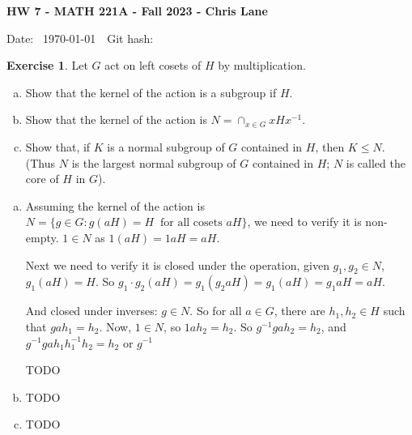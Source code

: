 \documentclass[11pt,oneside]{article}
\numberwithin{equation}{section}
\theoremstyle{definition}
\newtheorem{exercise}{Exercise}
\begin{document}
\textbf{HW 7 - MATH 221A - Fall 2023 - Chris Lane}

Date: \hhmmsstime{} \ \today \ \ Git hash: 


\begin{exercise}
  Let $G$ act on left cosets of $H$ by multiplication.
  \begin{enumerate}[(a)]
  \item
    Show that the kernel of the action is a subgroup if $H$.  
  \item
    Show that the kernel of the action is $N = \cap _{x \in G} xHx^{-1}$.
  \item
    Show that, if $K$ is a normal subgroup of $G$ contained in $H$,
    then $K \leq N$.  (Thus $N$ is the largest normal subgroup of $G$
    contained in $H$; $N$ is called the core of $H$ in $G$).
  \end{enumerate}
\end{exercise}
\begin{solution} 
  \begin{enumerate}[(a)]
  \item
    Assuming the kernel of the action is $ N = \{ g \in G : g(aH) = H \ \textrm{ for all cosets } aH \}$,
    we need to verify it is non-empty.  $1 \in N$ as $1 (aH) = 1aH = aH$.

    Next we need to verify it is closed under the operation,
    given $g_1, g_2 \in N$, $g_1(aH) = H$.  So $g_1 \cdot g_2 (aH) = g_1 (g_2aH) = g_1 (aH) = g_1 a H  = a H$.

    And closed under inverses:  $g \in N$.  So for all $a \in G$, there are $h_1, h_2 \in H$ such
    that $g a h_1 = h_2$.  Now, $1 \in N$, so $ 1 a h_2 = h_2$.  So $g^ {-1} g a h_2 = h_2$, and
    $ g ^ {-1} g a h_1 h_1^{-1} h_2 = h_2$ or $ g ^ {-1}$

    TODO
    
  \item
    TODO
  \item
    TODO
  \end{enumerate}
    
\end{solution}
\end{document}
